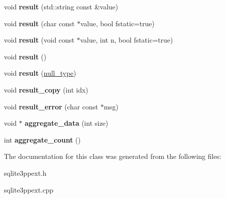 \begin{DoxyCompactItemize}
\item 
\hypertarget{classsqlite3pp_1_1ext_1_1context_a068c74a26a53283916919a67139a60e0}{void {\bfseries result} (std\-::string const \&value)}\label{classsqlite3pp_1_1ext_1_1context_a068c74a26a53283916919a67139a60e0}

\item 
\hypertarget{classsqlite3pp_1_1ext_1_1context_a051c2ca3865cca1a584fdd0f805245b5}{void {\bfseries result} (char const $\ast$value, bool fstatic=true)}\label{classsqlite3pp_1_1ext_1_1context_a051c2ca3865cca1a584fdd0f805245b5}

\item 
\hypertarget{classsqlite3pp_1_1ext_1_1context_a10845cffae213febaeaadab7f53442a0}{void {\bfseries result} (void const $\ast$value, int n, bool fstatic=true)}\label{classsqlite3pp_1_1ext_1_1context_a10845cffae213febaeaadab7f53442a0}

\item 
\hypertarget{classsqlite3pp_1_1ext_1_1context_aa72765ff4f1f6618379ff8a27f532e57}{void {\bfseries result} ()}\label{classsqlite3pp_1_1ext_1_1context_aa72765ff4f1f6618379ff8a27f532e57}

\item 
\hypertarget{classsqlite3pp_1_1ext_1_1context_a7a4b071b8b70c962b35336d7ed554d7c}{void {\bfseries result} (\hyperlink{classsqlite3pp_1_1null__type}{null\-\_\-type})}\label{classsqlite3pp_1_1ext_1_1context_a7a4b071b8b70c962b35336d7ed554d7c}

\item 
\hypertarget{classsqlite3pp_1_1ext_1_1context_a7da6fea6eaa62c9f3723fdcee1d7ce5d}{void {\bfseries result\-\_\-copy} (int idx)}\label{classsqlite3pp_1_1ext_1_1context_a7da6fea6eaa62c9f3723fdcee1d7ce5d}

\item 
\hypertarget{classsqlite3pp_1_1ext_1_1context_aff50f7fc48fd1988ca3b3550072eb10a}{void {\bfseries result\-\_\-error} (char const $\ast$msg)}\label{classsqlite3pp_1_1ext_1_1context_aff50f7fc48fd1988ca3b3550072eb10a}

\item 
\hypertarget{classsqlite3pp_1_1ext_1_1context_a6c858075387a36360564f8f763ab2045}{void $\ast$ {\bfseries aggregate\-\_\-data} (int size)}\label{classsqlite3pp_1_1ext_1_1context_a6c858075387a36360564f8f763ab2045}

\item 
\hypertarget{classsqlite3pp_1_1ext_1_1context_a7b90abdc58b9cc33062d1882e41c4dc0}{int {\bfseries aggregate\-\_\-count} ()}\label{classsqlite3pp_1_1ext_1_1context_a7b90abdc58b9cc33062d1882e41c4dc0}

\end{DoxyCompactItemize}


The documentation for this class was generated from the following files\-:\begin{DoxyCompactItemize}
\item 
sqlite3ppext.\-h\item 
sqlite3ppext.\-cpp\end{DoxyCompactItemize}
